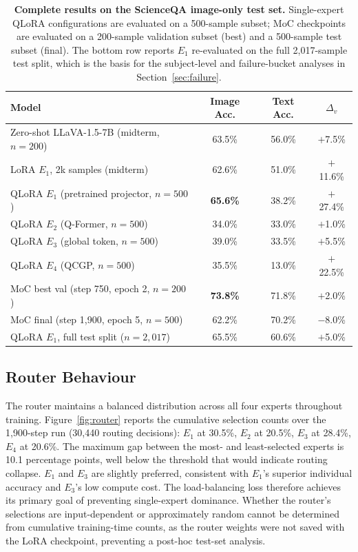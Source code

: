\documentclass{article}
\begin{document}
\begin{table}[h]
\centering
\caption{\textbf{Complete results on the ScienceQA image-only test set.} Single-expert QLoRA configurations are evaluated on a 500-sample subset; MoC checkpoints are evaluated on a 200-sample validation subset (best) and a 500-sample test subset (final). The bottom row reports $E_1$ re-evaluated on the full 2{,}017-sample test split, which is the basis for the subject-level and failure-bucket analyses in Section~\ref{sec:failure}.}
\label{tab:full}
\small
\begin{tabular}{lccc}
\toprule
\textbf{Model} & \textbf{Image Acc.} & \textbf{Text Acc.} & $\Delta_v$ \\
\midrule
Zero-shot LLaVA-1.5-7B (midterm, $n=200$)         & 63.5\% & 56.0\% & $+$7.5\%  \\
LoRA $E_1$, 2k samples (midterm)                  & 62.6\% & 51.0\% & $+$11.6\% \\
\midrule
QLoRA $E_1$ (pretrained projector, $n=500$)       & \textbf{65.6\%} & 38.2\% & $+$27.4\% \\
QLoRA $E_2$ (Q-Former, $n=500$)                   & 34.0\% & 33.0\% & $+$1.0\%  \\
QLoRA $E_3$ (global token, $n=500$)               & 39.0\% & 33.5\% & $+$5.5\%  \\
QLoRA $E_4$ (QCGP, $n=500$)                       & 35.5\% & 13.0\% & $+$22.5\% \\
\midrule
MoC best val (step 750, epoch 2, $n=200$)         & \textbf{73.8\%} & 71.8\% & $+$2.0\%  \\
MoC final (step 1{,}900, epoch 5, $n=500$)        & 62.2\% & 70.2\% & $-$8.0\%  \\
\midrule
QLoRA $E_1$, full test split ($n=2{,}017$)        & 65.5\% & 60.6\% & $+$5.0\%  \\
\bottomrule
\end{tabular}
\end{table}

\subsection{Router Behaviour}

The router maintains a balanced distribution across all four experts throughout training. Figure~\ref{fig:router} reports the cumulative selection counts over the 1{,}900-step run (30{,}440 routing decisions): $E_1$ at 30.5\%, $E_2$ at 20.5\%, $E_3$ at 28.4\%, $E_4$ at 20.6\%. The maximum gap between the most- and least-selected experts is 10.1 percentage points, well below the threshold that would indicate routing collapse. $E_1$ and $E_3$ are slightly preferred, consistent with $E_1$'s superior individual accuracy and $E_3$'s low compute cost. The load-balancing loss therefore achieves its primary goal of preventing single-expert dominance. Whether the router's selections are input-dependent or approximately random cannot be determined from cumulative training-time counts, as the router weights were not saved with the LoRA checkpoint, preventing a post-hoc test-set analysis.
\end{document}
